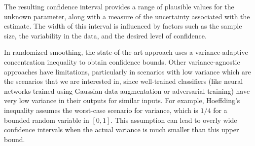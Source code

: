 The resulting confidence interval provides a range of plausible values for the unknown parameter, along with a measure of the uncertainty associated with the estimate.
The width of this interval is influenced by factors such as the sample size, the variability in the data, and the desired level of confidence.

In randomized smoothing, the state-of-the-art approach uses a variance-adaptive concentration inequality to obtain confidence bounds.
Other variance-agnostic approaches have limitations, particularly in scenarios with low variance which are the scenarios that we are interested in, since well-trained classifiers (like neural networks trained using Gaussian data augmentation or adversarial training) have very low variance in their outputs for similar inputs.
For example, Hoeffding's inequality assumes the worst-case scenario for variance, which is $1/4$ for a bounded random variable in $[0,1]$.
This assumption can lead to overly wide confidence intervals when the actual variance is much smaller than this upper bound.

